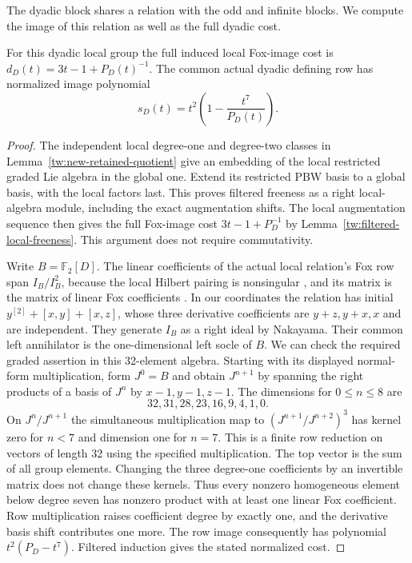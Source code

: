 The dyadic block shares a relation with the odd and infinite blocks.
We compute the image of this relation as well as the full dyadic cost.
\begin{lemma}\label{tw:new-local-fox}
For this dyadic local group the full induced local Fox-image cost is
$d_D(t)=3t-1+P_D(t)^{-1}$. The common actual dyadic defining row has
normalized image polynomial
\[
 s_D(t)=t^2\left(1-\frac{t^7}{P_D(t)}\right).
\]
\end{lemma}
\begin{proof}
The independent local degree-one and degree-two classes in
Lemma~\ref{tw:new-retained-quotient} give an embedding of the local
restricted graded Lie algebra in the global one. Extend its restricted
PBW basis to a global basis, with the local factors last. This proves
filtered freeness as a right local-algebra module, including the exact
augmentation shifts. The local augmentation sequence then gives the
full Fox-image cost $3t-1+P_D^{-1}$ by
Lemma~\ref{tw:filtered-local-freeness}. This argument does not require
commutativity.

Write $B=\mathbb F_2[D]$. The linear coefficients of the actual
local relation's Fox row span $I_B/I_B^2$, because the local Hilbert
pairing is nonsingular \cite[Chapter~III, Theorem~4.4]{MilneCFT}, and
its matrix is the matrix of linear Fox coefficients
\cite[Proposition~3.2]{Quadrelli2021}. In our coordinates the relation
has initial $y^{[2]}+[x,y]+[x,z]$, whose three derivative coefficients
are $y+z,y+x,x$ and are independent. They generate $I_B$ as a right ideal by
Nakayama. Their common left annihilator is the one-dimensional left socle of $B$.
We can check the required graded assertion in this 32-element algebra.
Starting with its displayed normal-form multiplication,
form $J^0=B$ and obtain $J^{n+1}$ by spanning the right products of a
basis of $J^n$ by $x-1,y-1,z-1$. The dimensions for $0\le n\le8$ are
\[
 32,31,28,23,16,9,4,1,0.
\]
On $J^n/J^{n+1}$ the simultaneous multiplication map to
$(J^{n+1}/J^{n+2})^3$ has kernel zero for $n<7$ and dimension one for
$n=7$. This is a finite row reduction on vectors of length 32 using the
specified multiplication. The top vector is the sum of all group elements.
Changing the three degree-one coefficients by an invertible matrix does
not change these kernels. Thus every nonzero homogeneous element below
degree seven has nonzero product with at least one linear Fox coefficient. Row
multiplication raises coefficient degree by exactly one, and the
derivative basis shift contributes one more. The row image consequently has
polynomial $t^2(P_D-t^7)$. Filtered induction gives the stated normalized
cost.


\end{proof}
